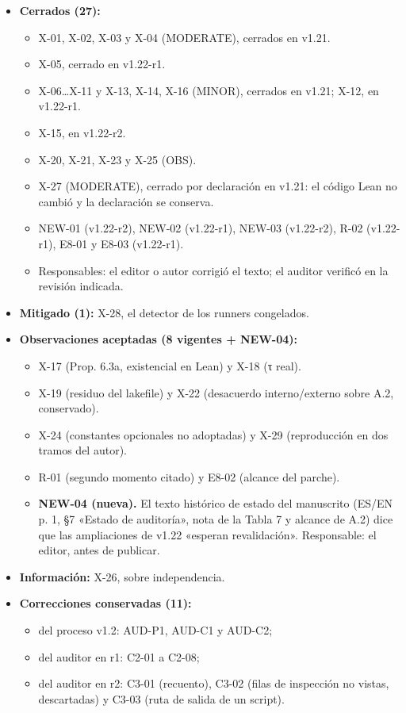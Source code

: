 \documentclass[
]{article}
\providecommand{\tightlist}{%
  \setlength{\itemsep}{0pt}\setlength{\parskip}{0pt}}
\begin{document}
\begin{itemize}
\tightlist
\item
  \textbf{Cerrados (27):}

  \begin{itemize}
  \tightlist
  \item
    X-01, X-02, X-03 y X-04 (MODERATE), cerrados en v1.21.
  \item
    X-05, cerrado en v1.22-r1.
  \item
    X-06\ldots X-11 y X-13, X-14, X-16 (MINOR), cerrados en v1.21; X-12,
    en v1.22-r1.
  \item
    X-15, en v1.22-r2.
  \item
    X-20, X-21, X-23 y X-25 (OBS).
  \item
    X-27 (MODERATE), cerrado por declaración en v1.21: el código Lean no
    cambió y la declaración se conserva.
  \item
    NEW-01 (v1.22-r2), NEW-02 (v1.22-r1), NEW-03 (v1.22-r2), R-02
    (v1.22-r1), E8-01 y E8-03 (v1.22-r1).
  \item
    Responsables: el editor o autor corrigió el texto; el auditor
    verificó en la revisión indicada.
  \end{itemize}
\item
  \textbf{Mitigado (1):} X-28, el detector de los runners congelados.
\item
  \textbf{Observaciones aceptadas (8 vigentes + NEW-04):}

  \begin{itemize}
  \tightlist
  \item
    X-17 (Prop. 6.3a, existencial en Lean) y X-18 (τ real).
  \item
    X-19 (residuo del lakefile) y X-22 (desacuerdo interno/externo sobre
    A.2, conservado).
  \item
    X-24 (constantes opcionales no adoptadas) y X-29 (reproducción en
    dos tramos del autor).
  \item
    R-01 (segundo momento citado) y E8-02 (alcance del parche).
  \item
    \textbf{NEW-04 (nueva).} El texto histórico de estado del manuscrito
    (ES/EN p. 1, §7 «Estado de auditoría», nota de la Tabla 7 y alcance
    de A.2) dice que las ampliaciones de v1.22 «esperan revalidación».
    Responsable: el editor, antes de publicar.
  \end{itemize}
\item
  \textbf{Información:} X-26, sobre independencia.
\item
  \textbf{Correcciones conservadas (11):}

  \begin{itemize}
  \tightlist
  \item
    del proceso v1.2: AUD-P1, AUD-C1 y AUD-C2;
  \item
    del auditor en r1: C2-01 a C2-08;
  \item
    del auditor en r2: C3-01 (recuento), C3-02 (filas de inspección no
    vistas, descartadas) y C3-03 (ruta de salida de un script).
  \end{itemize}
\end{itemize}
\end{document}
